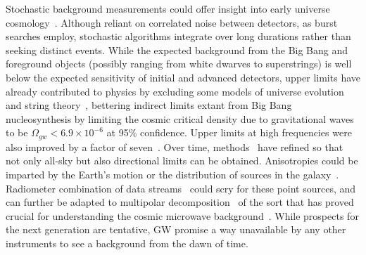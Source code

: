 Stochastic background measurements could offer insight into early universe cosmology~\cite{Maggiore2000}.
Although reliant on correlated noise between detectors, as burst searches employ, stochastic algorithms integrate over long durations rather than seeking distinct events.
While the expected background from the Big Bang and foreground objects (possibly ranging from white dwarves to superstrings) is well below the expected sensitivity of initial and advanced detectors, upper limits have already contributed to physics by excluding some models of universe evolution and string theory~\cite{LIGOStochasticNature2009}, bettering indirect limits extant from Big Bang nucleosynthesis by limiting the cosmic critical density due to gravitational waves to be $\Omega_{gw} < 6.9\times 10^{-6}$ at 95\% confidence.
Upper limits at high frequencies were also improved by a factor of seven~\cite{AbadiePRDStochastic2012}.
Over time, methods~\cite{Allen1999,FotopoulosThesis,Abbott2006,Abbott2007} have refined so that not only all-sky but also directional limits can be obtained.
Anisotropies could be imparted by the Earth's motion or the distribution of sources in the galaxy~\cite{Allen1997}.
Radiometer combination of data streams~\cite{Radiometer2006} could scry for these point sources, and can further be adapted to multipolar decomposition~\cite{MeadorsCaltech2007} of the sort that has proved crucial for understanding the cosmic microwave background~\cite{Muciaccia1997}.
While prospects for the next generation are tentative, GW promise a way unavailable by any other instruments to see a background from the dawn of time.


